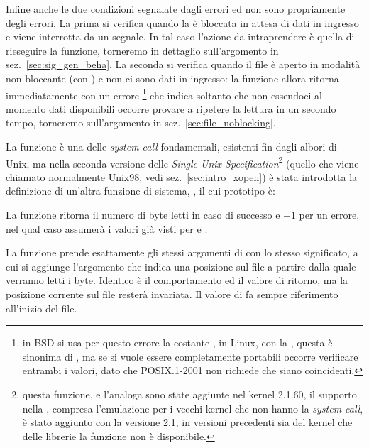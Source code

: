 Infine anche le due condizioni segnalate dagli errori  ed
 non sono propriamente degli errori. La prima si verifica
quando la  è bloccata in attesa di dati in ingresso e viene
interrotta da un segnale. In tal caso l'azione da intraprendere è quella di
rieseguire la funzione, torneremo in dettaglio sull'argomento in
sez.~\ref{sec:sig_gen_beha}.  La seconda si verifica quando il file è aperto
in modalità non bloccante (con ) e non ci sono dati in
ingresso: la funzione allora ritorna immediatamente con un errore
\footnote{in BSD si usa per questo errore la costante
  , in Linux, con la , questa è sinonima di
  , ma se si vuole essere completamente portabili occorre
  verificare entrambi i valori, dato che POSIX.1-2001 non richiede che siano
  coincidenti.} che indica soltanto che non essendoci al momento dati
disponibili occorre provare a ripetere la lettura in un secondo tempo,
torneremo sull'argomento in sez.~\ref{sec:file_noblocking}.

La funzione  è una delle \textit{system call} fondamentali,
esistenti fin dagli albori di Unix, ma nella seconda versione delle
\textit{Single Unix Specification}\footnote{questa funzione, e l'analoga
   sono state aggiunte nel kernel 2.1.60, il supporto nella
  , compresa l'emulazione per i vecchi kernel che non hanno la
  \textit{system call}, è stato aggiunto con la versione 2.1, in versioni
  precedenti sia del kernel che delle librerie la funzione non è disponibile.}
(quello che viene chiamato normalmente Unix98, vedi
sez.~\ref{sec:intro_xopen}) è stata introdotta la definizione di un'altra
funzione di sistema, , il cui prototipo è:

\begin{funcproto}{
}

{La funzione ritorna il numero di byte letti in caso di successo e $-1$ per un
  errore, nel qual caso  assumerà i valori già visti per
   e .}
\end{funcproto}

La funzione prende esattamente gli stessi argomenti di  con lo
stesso significato, a cui si aggiunge l'argomento  che indica
una posizione sul file a partire dalla quale verranno letti i 
byte. Identico è il comportamento ed il valore di ritorno, ma la posizione
corrente sul file resterà invariata.  Il valore di  fa sempre
riferimento all'inizio del file.

